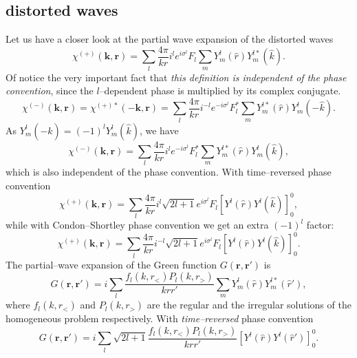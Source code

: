 \begin{subappendices}
\section{distorted waves}\label{C7AppE}
Let us have a closer look at the partial wave expansion of the distorted waves
 \begin{equation}\label{eqC7L1}
\chi^{(+)}(\mathbf{k},\mathbf{r})= \sum_{l}\frac{ 4\pi }{k r} i^{l}
e^{i\sigma^{l}} F_{l} \sum_m Y_m^{l} (\hat r) Y_m^{l*} (\hat k).
\end{equation}
Of notice the very important fact that \emph{this definition is independent of the phase convention}, since the $l$--dependent phase is multiplied by its complex conjugate.
\begin{equation}\label{eq34}
\chi^{(-)}(\mathbf{k},\mathbf{r})=\chi^{(+)*}(-\mathbf{k},\mathbf{r})= \sum_{l}\frac{ 4\pi }{k r} i^{-l}
e^{-i\sigma^{l}} F^*_{l} \sum_m Y_m^{l*} (\hat r) Y_m^{l} (-\hat k).
\end{equation}
As $Y_m^{l} (-\hat k)=(-1)^l Y_m^{l} (\hat k)$, we have
\begin{equation}\label{eq35}
\chi^{(-)}(\mathbf{k},\mathbf{r})= \sum_{l}\frac{ 4\pi }{k r} i^{l}
e^{-i\sigma^{l}} F^*_{l} \sum_m Y_m^{l*} (\hat r) Y_m^{l} (\hat k),
\end{equation}
which is also independent of the phase convention.
With time--reversed phase convention
 \begin{equation}\label{eq36}
\chi^{(+)}(\mathbf{k},\mathbf{r})= \sum_{l}\frac{ 4\pi }{k r} i^{l}\sqrt{2l+1}
e^{i\sigma^{l}} F_{l} \left[ Y^{l} (\hat r) Y^{l} (\hat k)\right]^0_0,
\end{equation}
while with Condon--Shortley phase convention we get an extra $(-1)^l$ factor:
 \begin{equation}\label{eq87}
\chi^{(+)}(\mathbf{k},\mathbf{r})= \sum_{l}\frac{ 4\pi }{k r} i^{-l}\sqrt{2l+1}
e^{i\sigma^{l}} F_{l} \left[ Y^{l} (\hat r) Y^{l} (\hat k)\right]^0_0.
\end{equation}
The partial--wave expansion of the Green function $G(\mathbf{r},\mathbf{r}')$ is
 \begin{equation}\label{eq134}
G(\mathbf{r},\mathbf{r}')= i\sum_{l}\frac{f_l(k,r_<)P_l(k,r_>)}{krr'} \sum_m Y_m^{l} (\hat r) Y_m^{l*} (\hat r'),
\end{equation}
where $f_l(k,r_<)$ and $P_l(k,r_>)$ are the regular and the irregular solutions of the homogeneous problem respectively.
With \emph{time--reversed} phase convention
 \begin{equation}\label{eq135}
G(\mathbf{r},\mathbf{r}')= i\sum_{l}\sqrt{2l+1}\frac{f_l(k,r_<)P_l(k,r_>)}{krr'} \left[ Y^{l} (\hat r) Y^{l} (\hat r')\right]^0_0.
\end{equation}

\end{subappendices}
